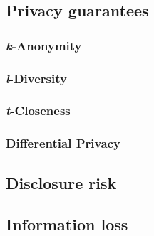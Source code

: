 \subsection{Privacy guarantees}
\label{Theory::SDC::Guarantees}

\subsubsection{\textit{k}-Anonymity}
\subsubsection{\textit{l}-Diversity}
\subsubsection{\textit{t}-Closeness}
\subsubsection{Differential Privacy}

\subsection{Disclosure risk}
\label{Theory::SDC::DisclosureRisk}

\subsection{Information loss}
\label{Theory::SDC::InformationLoss}